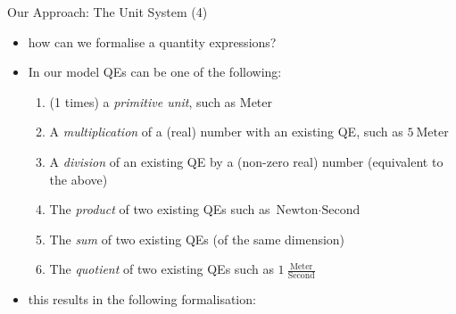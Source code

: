 \documentclass{beamer}
\begin{document}
  \begin{frame}{Our Approach: The Unit System (4)}
    \begin{itemize}[<+->]
      \item how can we formalise a quantity expressions?
      \item In our model QEs can be one of the following:
      \begin{enumerate}
        \item (1 times) a \textit{primitive unit}, such as Meter
        \item A \textit{multiplication} of a (real) number with an existing QE, such as $5\ \text{Meter}$
        \item A \textit{division} of an existing QE by a (non-zero real) number (equivalent to the above)
        \item The \textit{product} of two existing QEs such as $\text{Newton} \cdot{} \text{Second}$
        \item The \textit{sum} of two existing QEs (of the same dimension)
        \item The \textit{quotient} of two existing QEs such as $1\ \frac{\text{Meter}}{\text{Second}}$
      \end{enumerate}
      \item this results in the following formalisation:
    \end{itemize}
  \end{frame}
\end{document}
